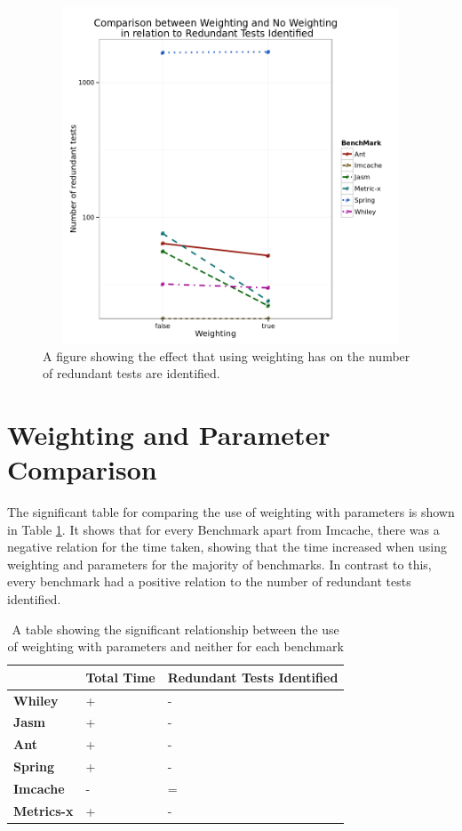 \begin{figure}[h]
\begin{center}
\includegraphics[height=10cm, width = 14.5cm]{Weighting.png}
\end{center}
\caption{A figure showing the effect that using weighting has on the number of redundant tests are identified.}
\label{fig:weightgraph}
\end{figure}

\section{Weighting and Parameter Comparison}

The significant table for comparing the use of weighting with parameters is shown in Table \ref{weightingparamsig}. It shows that for every Benchmark apart from Imcache, there was a negative relation for the time taken, showing that the time increased when using weighting and parameters for the majority of benchmarks. In contrast to this, every benchmark had a positive relation to the number of redundant tests identified.

\begin{table}[h]
\centering
\label{weightingparamsig}
\begin{tabular}{|l|l|l|}
\hline
{\bf }          & {\bf Total Time} & {\bf Redundant Tests Identified} \\ \hline
{\bf Whiley}    & +                & -                           \\ \hline
{\bf Jasm}      & +                & -                           \\ \hline
{\bf Ant}       & +                & -                           \\ \hline
{\bf Spring}    & +                & -                           \\ \hline
{\bf Imcache}   & -                & =                           \\ \hline
{\bf Metrics-x} & +                & -                           \\ \hline
\end{tabular}
\caption{A table showing the significant relationship between the use of weighting with parameters and neither for each benchmark}
\end{table}


